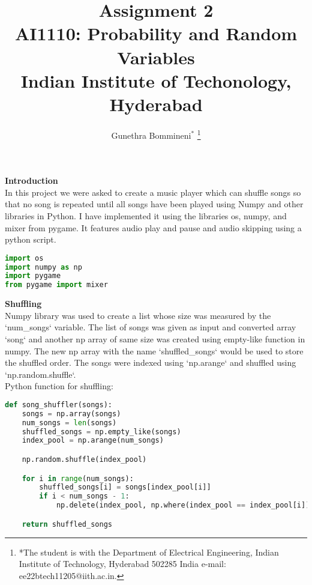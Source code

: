 \documentclass[journal,12pt,twocolumn]{IEEEtran}
\begin{document}
\let\vec\mathbf

\vspace{3cm}

\title{
\textbf {Assignment 2}\\ \large \textbf{AI1110}: Probability and Random Variables\\Indian Institute of Techonology, Hyderabad
}
\author{Gunethra Bommineni$^{*}$%
	\thanks{*The student is with the Department
		of Electrical Engineering, Indian Institute of Technology, Hyderabad
		502285 India e-mail: ee22btech11205@iith.ac.in.}
  }

\maketitle

\newpage


\bigskip
\renewcommand{\thefigure}{\theenumi}
\renewcommand{\thetable}{\theenumi}
\textbf{Introduction\\}
In this project we were asked to create a music player which can shuffle songs so that no song is repeated until all songs have been played using Numpy and other libraries in Python. I have implemented it using the libraries os, numpy, and mixer from pygame. It features audio play and pause and audio skipping using a python script.
\begin{lstlisting}[language=Python, caption=Libraries used]
import os
import numpy as np
import pygame
from pygame import mixer
\end{lstlisting}

\textbf{Shuffling\\}
Numpy library was used to create a list whose size was measured by the `num\_songs` variable. The list of songs was given as input and converted  array `song` and another np array of same size was created using empty-like function in numpy. The new np array with the name `shuffled\_songs` would be used to store the shuffled order. The songs were indexed using `np.arange` and shuffled using `np.random.shuffle`.\\
Python function for shuffling:\cite{shuffle}
\begin{lstlisting}[language=Python, caption=Shuffling function]
def song_shuffler(songs):
    songs = np.array(songs)
    num_songs = len(songs)
    shuffled_songs = np.empty_like(songs)
    index_pool = np.arange(num_songs)

    np.random.shuffle(index_pool)

    for i in range(num_songs):
        shuffled_songs[i] = songs[index_pool[i]]
        if i < num_songs - 1:
            np.delete(index_pool, np.where(index_pool == index_pool[i]))

    return shuffled_songs
\end{lstlisting}
\end{document}
